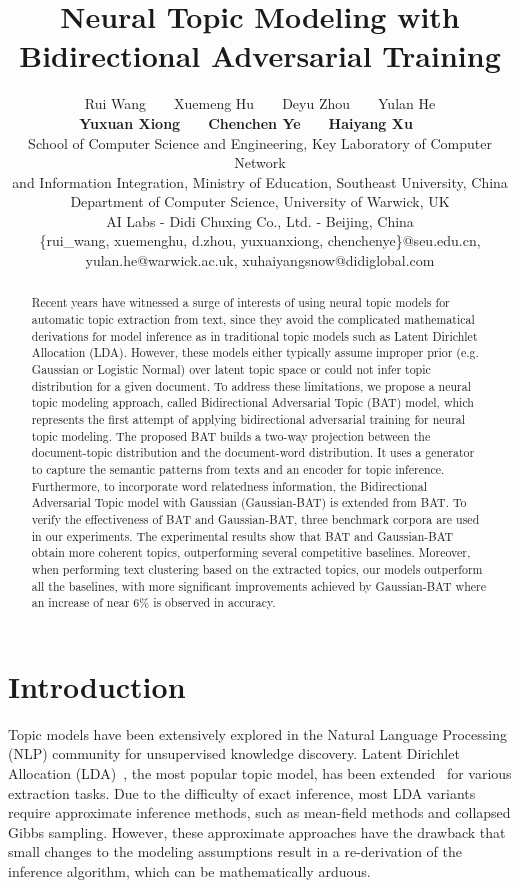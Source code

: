 \documentclass[11pt,a4paper]{article}
\title{Neural Topic Modeling with Bidirectional Adversarial Training}
\author{Rui Wang\ \ \ \  Xuemeng Hu\ \ \ \  Deyu Zhou\ \ \ \ Yulan He \\ \textbf{Yuxuan Xiong}\ \ \ \   \textbf{Chenchen Ye}\ \ \ \ \textbf{Haiyang Xu}\ \ \ \ \\
	School of Computer Science and Engineering, Key Laboratory of Computer Network\\
	and Information Integration, Ministry of Education, Southeast University, China \\
	Department of Computer Science, University of Warwick, UK \\
	AI Labs - Didi Chuxing Co., Ltd. - Beijing, China\\
	\{rui\_wang, xuemenghu, d.zhou, yuxuanxiong, chenchenye\}@seu.edu.cn,\\  yulan.he@warwick.ac.uk, xuhaiyangsnow@didiglobal.com}
\date{}
\begin{document}
\maketitle
\begin{abstract}
{\color{black}Recent years have witnessed a surge of interests of using neural topic models for automatic topic extraction from text, since they avoid the complicated mathematical derivations for model inference as in traditional topic models such as Latent Dirichlet Allocation (LDA). {\color{black}However, these models  either typically assume improper prior (e.g. Gaussian or Logistic Normal) over latent topic space or could not infer topic distribution for a given document.}
To address these limitations, 
we propose a neural topic modeling approach, called Bidirectional Adversarial Topic (BAT) model, which represents the first attempt of applying bidirectional adversarial training for neural topic modeling. The proposed BAT builds a two-way projection between the document-topic distribution and the document-word distribution. It uses a generator to capture the semantic patterns from texts and an encoder for topic inference. Furthermore, to incorporate word relatedness information, the Bidirectional Adversarial Topic model with Gaussian (Gaussian-BAT) is extended from BAT. To verify the effectiveness of BAT and Gaussian-BAT, three benchmark corpora are used in our experiments. The experimental results show that BAT and Gaussian-BAT obtain more coherent topics, outperforming several competitive baselines. Moreover, when performing text clustering based on the extracted topics,  
our models outperform all the baselines, with more significant improvements achieved by Gaussian-BAT where an increase of near 6\% is observed in accuracy.
}
\end{abstract}

\begin{comment}
{\color{blue}However, these models typically assume Gaussian prior or Logistic-Normal prior instead of Dirichlet prior which is more appropriate for topic modeling.}
\end{comment}


\section{Introduction}
Topic models have been extensively explored in the Natural Language Processing (NLP) community for unsupervised knowledge discovery. Latent Dirichlet Allocation (LDA)~\cite{blei2003latent}, the most popular topic model, has been extended~\cite{lin2009joint,zhou2014simple,cheng2014btm} for various extraction tasks. Due to the difficulty of exact inference, most LDA variants require approximate inference methods, such as mean-field methods and collapsed Gibbs sampling. However, these approximate approaches have the drawback that small changes to the modeling assumptions result in a re-derivation of the inference algorithm, which can be mathematically arduous. 
\end{document}
